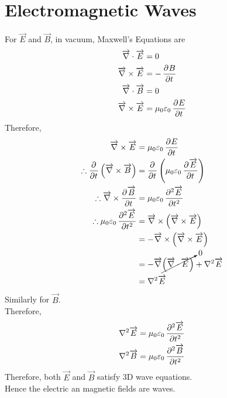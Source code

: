 \documentclass[fleqn, a4paper, 12pt, twoside]{article}
\theoremstyle{definition}
\theoremstyle{theorem}
\begin{document}
\section{Electromagnetic Waves}

For $\overrightarrow{E}$ and $\overrightarrow{B}$, in vacuum, Maxwell's Equations are
\begin{align*}
	\overrightarrow{\nabla} \cdot \overrightarrow{E} &= 0\\
	\overrightarrow{\nabla} \times \overrightarrow{E} &= -\dpd{B}{t}\\
	\overrightarrow{\nabla} \cdot \overrightarrow{B} &= 0\\
	\overrightarrow{\nabla} \times \overrightarrow{E} &= \mu_0 \varepsilon_0 \dpd{E}{t}
\end{align*}
Therefore,
\begin{align*}
	\overrightarrow{\nabla} \times \overrightarrow{E}                                    & = \mu_0 \varepsilon_0 \dpd{E}{t}                                                                                        \\
	\therefore \dpd{}{t}\left( \overrightarrow{\nabla} \times \overrightarrow{B} \right) & = \dpd{}{t}\left( \mu_0 \varepsilon_0 \dpd{\overrightarrow{E}}{t} \right)                                               \\
	\therefore \overrightarrow{\nabla} \times \dpd{\overrightarrow{B}}{t}                & = \mu_0 \varepsilon_0 \dpd[2]{\overrightarrow{E}}{t}                                                                    \\
	\therefore \mu_0 \varepsilon_0 \dpd[2]{\overrightarrow{E}}{t}                        & =  \overrightarrow{\nabla} \times \left( \overrightarrow{\nabla} \times \overrightarrow{E} \right)                      \\
                                                                                             & = -\overrightarrow{\nabla} \times \left( \overrightarrow{\nabla} \times \overrightarrow{E} \right)                      \\
                                                                                             & = -\overrightarrow{\nabla} \cancelto{0}{\left( \overrightarrow{\nabla} \cdot \overrightarrow{E} \right)} + \nabla^2 \overrightarrow{E} \\
                                                                                             & = \nabla^2 \overrightarrow{E}                                                                                           \\
\end{align*}
Similarly for $\overrightarrow{B}$.\\
Therefore,
\begin{align*}
	\nabla^2 \overrightarrow{E} &= \mu_0 \varepsilon_0 \dpd[2]{\overrightarrow{E}}{t}\\
	\nabla^2 \overrightarrow{B} &= \mu_0 \varepsilon_0 \dpd[2]{\overrightarrow{B}}{t}
\end{align*}
Therefore, both $\overrightarrow{E}$ and $\overrightarrow{B}$ satisfy 3D wave equations.\\
Hence the electric an magnetic fields are waves.
\end{document}
